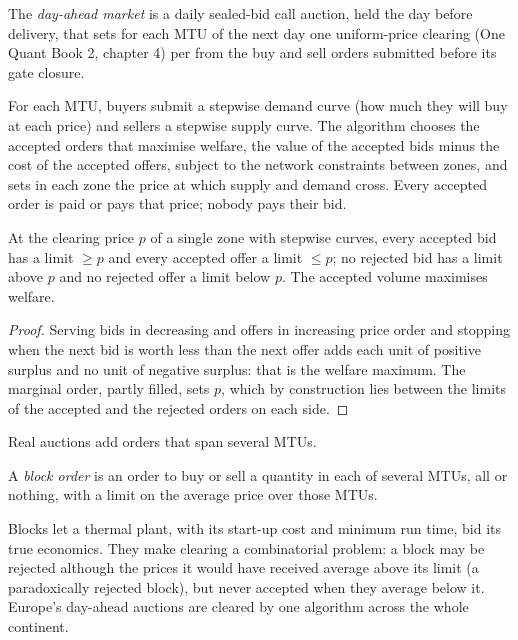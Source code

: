 \begin{definition}\label{def:m3:power-markets-design:da}
The \emph{day-ahead market} is a daily sealed-bid call auction,
held the day before delivery, that sets for each MTU of the next day one
uniform-price clearing (One Quant Book 2, chapter 4) per  from the
buy and sell orders submitted before its gate closure.
\end{definition}

For each MTU, buyers submit a stepwise demand curve (how much they will buy at each
price) and sellers a stepwise supply curve. The algorithm chooses the accepted orders
that maximise welfare, the value of the accepted bids minus the cost of the accepted
offers, subject to the network constraints between zones, and sets in each zone the
price at which supply and demand cross. Every accepted order is paid or pays that
price; nobody pays their bid.

\begin{proposition}\label{prop:m3:power-markets-design:support}
At the clearing price $p$ of a single zone with stepwise curves, every accepted bid has
a limit $\ge p$ and every accepted offer a limit $\le p$; no rejected bid has a limit
above $p$ and no rejected offer a limit below $p$. The accepted volume maximises welfare.
\end{proposition}

\begin{proof}
Serving bids in decreasing and offers in increasing price order and stopping when the
next bid is worth less than the next offer adds each unit of positive surplus and no
unit of negative surplus: that is the welfare maximum. The marginal order, partly
filled, sets $p$, which by construction lies between the limits of the accepted and the
rejected orders on each side.
\end{proof}

Real auctions add orders that span several MTUs.

\begin{definition}\label{def:m3:power-markets-design:block}
A \emph{block order} is an order to buy or sell a quantity in each of
several MTUs, all or nothing, with a limit on the average price over those MTUs.
\end{definition}

Blocks let a thermal plant, with its start-up cost and minimum run time, bid its true
economics. They make clearing a combinatorial problem: a block may be rejected although
the prices it would have received average above its limit (a paradoxically rejected
block), but never accepted when they average below it. Europe's day-ahead auctions are
cleared by one algorithm across the whole continent.

